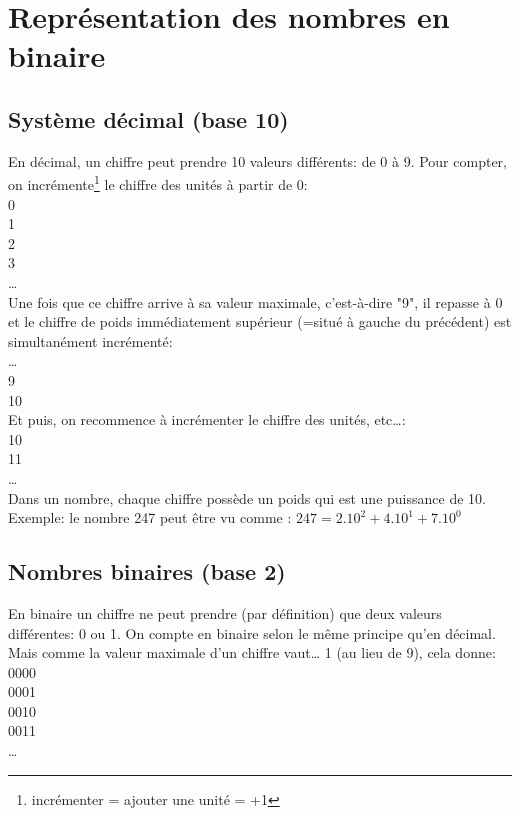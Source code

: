 
\vspace{5cm}
\newpage

\section{Représentation des nombres en binaire}
\subsection{Système décimal (base 10)}
En décimal, un chiffre peut prendre 10 valeurs différents: de 0 à 9.
Pour compter, on incrémente\footnote{incrémenter = ajouter une unité = +1} le chiffre des unités à partir de 0:\\
0\\
1\\
2\\
3\\
…\\

Une fois que ce chiffre arrive à sa valeur maximale, c'est-à-dire "9", il repasse à 0 et le chiffre de poids immédiatement supérieur (=situé à gauche du précédent) est simultanément incrémenté:\\
…\\
9\\
10\\

Et puis, on recommence à incrémenter le chiffre des unités, etc…:\\
10\\
11\\
…\\

Dans un nombre, chaque chiffre possède un poids qui est une puissance de 10.\\
Exemple: le nombre 247 peut être vu comme : $247 = 2.10^2 + 4.10^1 + 7.10^0$

 \subsection{Nombres binaires (base 2)}

En binaire un chiffre ne peut prendre (par définition) que deux valeurs différentes: 0 ou 1.
On compte en binaire selon le même principe qu'en décimal. Mais comme la valeur maximale d'un chiffre vaut… 1 (au lieu de 9), cela donne:\\
0000\\
0001\\
0010\\
0011\\
…\\

